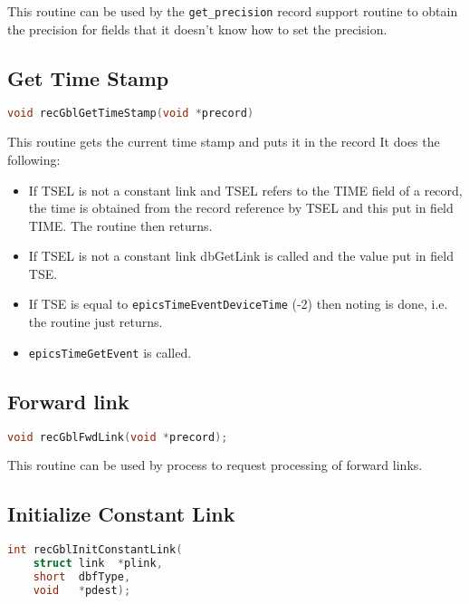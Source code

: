 This routine can be used by the \verb|get_precision| record support routine to obtain the precision for fields that it doesn't know how to set the precision.

\subsection{Get Time Stamp}

\begin{lstlisting}[language=C]
void recGblGetTimeStamp(void *precord)
\end{lstlisting}

This routine gets the current time stamp and puts it in the record It does the following:

\begin{itemize}
\item If TSEL is not a constant link and TSEL refers to the TIME field of a record, the time is obtained from the record reference by TSEL and this put in field TIME.
The routine then returns.

\item If TSEL is not a constant link dbGetLink is called and the value put in field TSE.

\item If TSE is equal to \verb|epicsTimeEventDeviceTime| (-2) then noting is done, i.e. the routine just returns.

\item \verb|epicsTimeGetEvent| is called.

\end{itemize}

\subsection{Forward link}

\begin{lstlisting}[language=C]
void recGblFwdLink(void *precord);
\end{lstlisting}

This routine can be used by process to request processing of forward links.

\subsection{Initialize Constant Link}

\begin{lstlisting}[language=C]
int recGblInitConstantLink(
    struct link  *plink,
    short  dbfType,
    void   *pdest);
\end{lstlisting}


